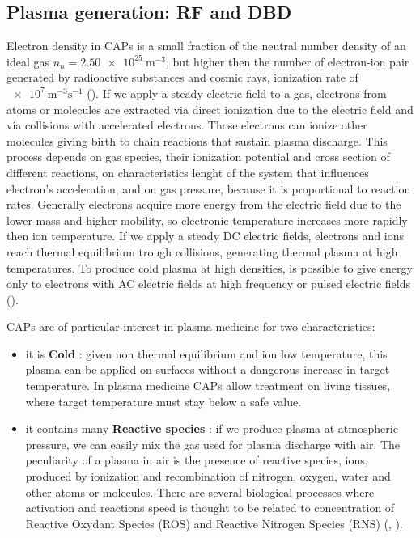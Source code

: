 \subsection{Plasma generation: RF and DBD}
Electron density in CAPs is a small fraction of the neutral number density of an ideal gas $n_{n} = \SI{2.50e25}{\meter^{-3}}$, but higher then the number of electron-ion pair generated by radioactive substances and cosmic rays, ionization rate of $\SI{e7}{\meter^{-3}\second^{-1}}$ (\cite{book:1593058}).
If we apply a steady electric field to a gas, electrons from atoms or molecules are extracted via direct ionization due to the electric field and via collisions with accelerated electrons. Those electrons can ionize other molecules giving birth to chain reactions that sustain plasma discharge. This process depends on gas species, their ionization potential and cross section of different reactions, on characteristics lenght of the system that influences electron's acceleration, and on gas pressure, because it is proportional to reaction rates.
Generally electrons acquire more energy from the electric field due to the lower mass and higher mobility, so electronic temperature increases more rapidly then ion temperature. If we apply a steady DC electric fields, electrons and ions reach thermal equilibrium trough collisions, generating thermal plasma at high temperatures. To produce cold plasma at high densities, is possible to give energy only to electrons with AC electric fields at high frequency or pulsed electric fields (\cite{BARDOS20106705}).

CAPs are of particular interest in plasma medicine for two characteristics:
\begin{itemize}
 \item it is \textbf{Cold} : given non thermal equilibrium and ion low temperature, this plasma can be applied on surfaces without a dangerous increase in target temperature. In plasma medicine CAPs allow treatment on living tissues, where target temperature must stay below a safe value.
 \item it contains many \textbf{Reactive species} : if we produce plasma at atmospheric pressure, we can easily mix the gas used for plasma discharge with air. The peculiarity of a plasma in air is the presence of reactive species, ions, produced by ionization and recombination of nitrogen, oxygen, water and other atoms or molecules. There are several biological processes where activation and reactions speed is thought to be related to concentration of Reactive Oxydant Species (ROS) and Reactive Nitrogen Species (RNS) (\cite{doi:10.1152/ajplung.2000.279.6.L1005}, \cite{doi:10.1152/ajpcell.00366.2006}). 
\end{itemize}

